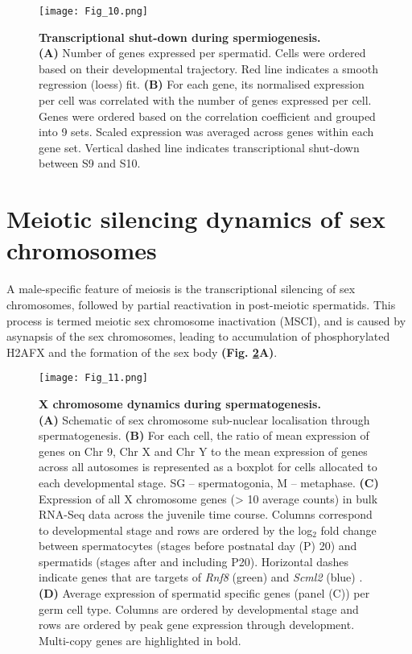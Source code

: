 \begin{figure}[!h]
\centering
\texttt{[image: Fig\_10.png]}
\caption[Transcriptional shut-down during spermiogenesis]{\textbf{Transcriptional shut-down during spermiogenesis.} \\
\textbf{(A)} Number of genes expressed per spermatid. Cells were ordered based on their developmental trajectory. Red line indicates a smooth regression (loess) fit. \textbf{(B)} For each gene, its normalised expression per cell was correlated with the number of genes expressed per cell. Genes were ordered based on the correlation coefficient and grouped into 9 sets. Scaled expression was averaged across genes within each gene set. Vertical dashed line indicates transcriptional shut-down between S9 and S10.}
\label{fig3:transcriptional_shutdown}
\end{figure}

\section{Meiotic silencing dynamics of sex chromosomes}

A male-specific feature of meiosis is the transcriptional silencing of sex chromosomes, followed by partial reactivation in post-meiotic spermatids. This process is termed meiotic sex chromosome inactivation (MSCI), and is caused by asynapsis of the sex chromosomes, leading to accumulation of phosphorylated H2AFX and the formation of the sex body \citep{Hamer2003} \textbf{(Fig. \ref{fig3:X_reactivation}A)}. 

\newpage

\begin{figure}[!h]
\centering
\texttt{[image: Fig\_11.png]}
\caption[X chromosome dynamics during spermatogenesis]{\textbf{X chromosome dynamics during spermatogenesis.} \\
\textbf{(A)} Schematic of sex chromosome sub-nuclear localisation through spermatogenesis. \textbf{(B)} For each cell, the ratio of mean expression of genes on Chr 9, Chr X and Chr Y to the mean expression of genes across all autosomes is represented as a boxplot for cells allocated to each developmental stage. SG – spermatogonia, M – metaphase. \textbf{(C)} Expression of all X chromosome genes (> 10 average counts) in bulk RNA-Seq data across the juvenile time course. Columns correspond to developmental stage and rows are ordered by the log$_2$ fold change between spermatocytes (stages before postnatal day (P) 20) and spermatids (stages after and including P20). Horizontal dashes indicate genes that are targets of \textit{Rnf8} (green) and \textit{Scml2} (blue) \citep{Adams2018}. \textbf{(D)} Average expression of spermatid specific genes (panel (C)) per germ cell type. Columns are ordered by developmental stage and rows are ordered by peak gene expression through development. Multi-copy genes are highlighted in bold.}
\label{fig3:X_reactivation}
\end{figure}

